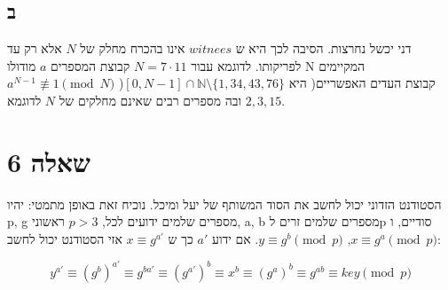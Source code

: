 \documentclass{article}
\begin{document}
\subsection*{ב}

דני יכשל נחרצות. הסיבה לכך היא ש
$witnees$
אינו בהכרח מחלק של $N$ אלא רק עד לפריקותו.
לדוגמא עבור
$N = 7 \cdot 11$
קבוצת המספרים $a$ מודולו N המקיימים \\
$a^{N-1} \not\equiv 1 \pmod{N}$ )קבוצת העדים האפשריים( היא
$[0, N-1] \cap \mathds{N} \setminus \{1,34, 43, 76\}$
ובה מספרים רבים שאינם מחלקים של $N$ לדוגמא $2, 3, 15$.

\section*{שאלה 6}

הסטודנט הזדוני יכול לחשב את הסוד המשותף של יעל ומיכל. נוכיח זאת באופן מתמטי:
יהיו p, g מספרים שלמים ידועים לכל,
$p > 3$
ראשוני,
a, b מספרים שלמים זרים לp סודיים,
ו 
$x \equiv g^a \pmod{p}$,
$y \equiv g^b \pmod{p}$.
אם ידוע
$a'$
כך ש
$x \equiv g^{a'}$
אזי הסטודנט יכול לחשב:

$$ y^{a'} \equiv (g^b)^{a'} \equiv g^{ba'} \equiv (g^{a'})^b \equiv x^b
\equiv (g^a)^b \equiv g^{ab} \equiv key \pmod{p}$$
\end{document}

